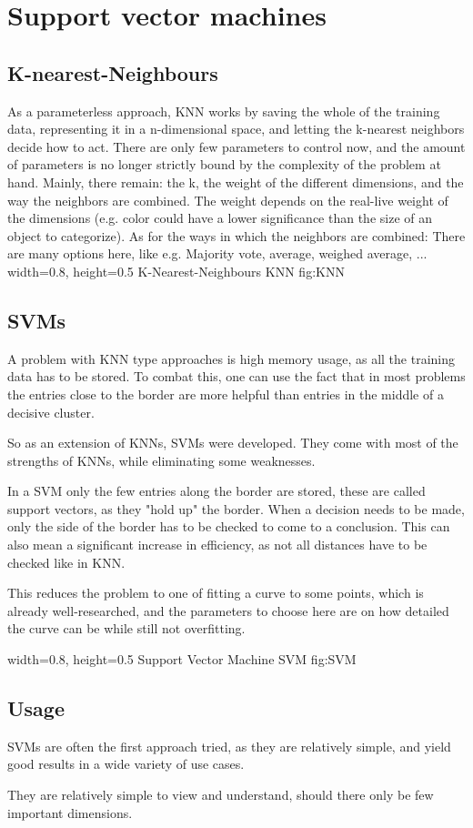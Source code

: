 \section{Support vector machines}
\label{sec:SVM}
\subsection{K-nearest-Neighbours}
As a parameterless approach, KNN works by saving the whole of the training data, representing it in a n-dimensional space, and letting the k-nearest neighbors decide how to act. There are only few parameters to control now, and the amount of parameters is no longer strictly bound by the complexity of the problem at hand. Mainly, there remain: the k, the weight of the different dimensions, and the way the neighbors are combined. 
The weight depends on the real-live weight of the dimensions (e.g. color could have a lower significance than the size of an object to categorize).
As for the ways in which the neighbors are combined: There are many options here, like e.g. Majority vote, average, weighed average, ...
    {width=0.8\textwidth, height=0.5\textheight} %
    {K-Nearest-Neighbours}   %
    {KNN}   %
    {fig:KNN}    %

\subsection{SVMs}
A problem with KNN type approaches is high memory usage, as all the training data has to be stored. To combat this, one can use the fact that in most problems the entries close to the border are more helpful than entries in the middle of a decisive cluster.

So as an extension of KNNs, SVMs were developed. They come with most of the strengths of KNNs, while eliminating some weaknesses.

In a SVM only the few entries along the border are stored, these are called support vectors, as they "hold up" the border. When a decision needs to be made, only the side of the border has to be checked to come to a conclusion. This can also mean a significant increase in efficiency, as not all distances have to be checked like in KNN.

This reduces the problem to one of fitting a curve to some points, which is already well-researched, and the parameters to choose here are on how detailed the curve can be while still not overfitting.


    {width=0.8\textwidth, height=0.5\textheight} %
    {Support Vector Machine}   %
    {SVM}   %
    {fig:SVM}    %

\subsection{Usage}
SVMs are often the first approach tried, as they are relatively simple, and yield good results in a wide variety of use cases. 

They are relatively simple to view and understand, should there only be few important dimensions.